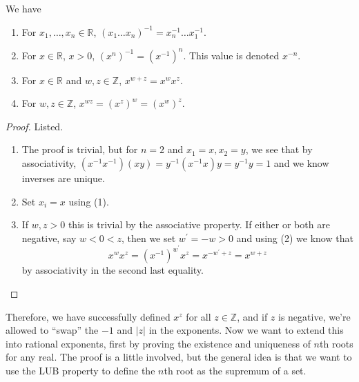   \begin{lemma}
    We have 
    \begin{enumerate}
      \item For $x_1, \ldots, x_n \in \mathbb{R}$, $(x_1 \ldots x_n)^{-1} = x_n^{-1} \ldots x_1^{-1}$. 
      \item For $x \in \mathbb{R}$, $x > 0$, $(x^n)^{-1} = (x^{-1})^n$. This value is denoted $x^{-n}$. 
      \item For $x \in \mathbb{R}$ and $w, z \in \mathbb{Z}$, $x^{w + z} = x^w x^z$. 
      \item For $w, z \in \mathbb{Z}$, $x^{wz} = (x^z)^w = (x^w)^z$. 
    \end{enumerate}
  \end{lemma}
  \begin{proof}
    Listed. 
    \begin{enumerate}
      \item The proof is trivial, but for $n = 2$ and $x_1 = x, x_2 = y$, we see that by associativity, $(x^{-1} x^{-1}) (x y) = y^{-1} (x^{-1} x) y = y^{-1} y = 1$ and we know inverses are unique. 
      \item Set $x_i = x$ using (1). 
      \item If $w, z > 0$ this is trivial by the associative property. If either or both are negative, say $w < 0 < z$, then we set $w^\prime = -w > 0$ and using (2) we know that 
      \begin{equation}
        x^{w} x^{z} = (x^{-1})^{w^\prime} x^z = x^{-w^\prime + z} = x^{w + z}
      \end{equation}
      by associativity in the second last equality. 
    \end{enumerate}
  \end{proof}

  Therefore, we have successfully defined $x^z$ for all $z \in \mathbb{Z}$, and if $z$ is negative, we're allowed to ``swap'' the $-1$ and $|z|$ in the exponents. Now we want to extend this into rational exponents, first by proving the existence and uniqueness of $n$th roots for any real. The proof is a little involved, but the general idea is that we want to use the LUB property to define the $n$th root as the supremum of a set.  

